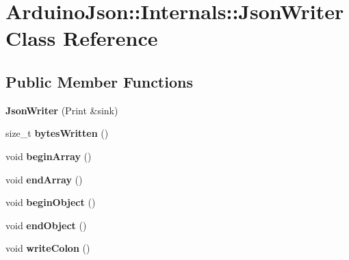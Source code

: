 \hypertarget{class_arduino_json_1_1_internals_1_1_json_writer}{}\section{Arduino\+Json\+:\+:Internals\+:\+:Json\+Writer Class Reference}
\label{class_arduino_json_1_1_internals_1_1_json_writer}
\subsection*{Public Member Functions}
\begin{DoxyCompactItemize}
\item 
\hypertarget{class_arduino_json_1_1_internals_1_1_json_writer_a29549cb139e22532c8dcd7fdd4570955}{}{\bfseries Json\+Writer} (Print \&sink)\label{class_arduino_json_1_1_internals_1_1_json_writer_a29549cb139e22532c8dcd7fdd4570955}

\item 
\hypertarget{class_arduino_json_1_1_internals_1_1_json_writer_a491d15e06706647bf148865af4db6498}{}size\+\_\+t {\bfseries bytes\+Written} ()\label{class_arduino_json_1_1_internals_1_1_json_writer_a491d15e06706647bf148865af4db6498}

\item 
\hypertarget{class_arduino_json_1_1_internals_1_1_json_writer_a368c20f3443b2c10b23c9ea18c6ef466}{}void {\bfseries begin\+Array} ()\label{class_arduino_json_1_1_internals_1_1_json_writer_a368c20f3443b2c10b23c9ea18c6ef466}

\item 
\hypertarget{class_arduino_json_1_1_internals_1_1_json_writer_ad4a25a30f3dc8a6aac5c62355c3fddd8}{}void {\bfseries end\+Array} ()\label{class_arduino_json_1_1_internals_1_1_json_writer_ad4a25a30f3dc8a6aac5c62355c3fddd8}

\item 
\hypertarget{class_arduino_json_1_1_internals_1_1_json_writer_a8a907d2782560df604af5c16ef03c744}{}void {\bfseries begin\+Object} ()\label{class_arduino_json_1_1_internals_1_1_json_writer_a8a907d2782560df604af5c16ef03c744}

\item 
\hypertarget{class_arduino_json_1_1_internals_1_1_json_writer_af223bff28545a6bc589857ecb541e049}{}void {\bfseries end\+Object} ()\label{class_arduino_json_1_1_internals_1_1_json_writer_af223bff28545a6bc589857ecb541e049}

\item 
\hypertarget{class_arduino_json_1_1_internals_1_1_json_writer_a909e8a284ae245699c8779299248f79c}{}void {\bfseries write\+Colon} ()\label{class_arduino_json_1_1_internals_1_1_json_writer_a909e8a284ae245699c8779299248f79c}


\end{DoxyCompactItemize}
